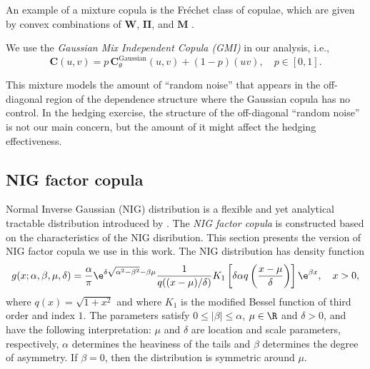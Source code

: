 
An example of a mixture copula is the Fr\'echet class of copulae, which
are given by convex combinations of $\bm{W}$, $\bm{\Pi}$, and $\bm{M}$
\citep{Nelsen1999}.  

We use the {\em Gaussian Mix Independent Copula (GMI)} in our analysis,
i.e., 
\begin{equation*}
  \bm{C}(u,v) = p\, \bm{C}^\text{Gaussian}_\theta (u,v) + (1-p)(uv),\quad p\in [0,1].
\end{equation*}

This mixture models the amount of ``random noise'' that appears in the
off-diagonal region of the dependence structure where the Gaussian copula has no control.
In the hedging exercise, the structure of the off-diagonal ``random noise'' is not our main concern, 
but the amount of it might affect the hedging effectiveness.

\subsection{NIG factor copula}

Normal Inverse Gaussian (NIG) distribution is a flexible and yet analytical tractable distribution introduced by
\citep{BarndorffNielsen1997}.
The {\em NIG factor copula} is constructed based on the characteristics of the NIG disribution. 
This section presents the version of NIG factor copula we use in this work.
The NIG distribution has density function
\begin{equation*}
  g(x; \alpha,\beta, \mu, \delta) = \frac{\alpha}{\pi} \e^{\delta
    \sqrt{\alpha^2-\beta^2} -\beta\mu} \frac{1}{q((x-\mu)/\delta)}
  K_1\left[\delta \alpha q\left(\frac{x-\mu}{\delta}\right) \right]
  \e^{\beta x},\quad x>0,
\end{equation*}
where $q(x) = \sqrt{1+x^2}$ and where $K_1$ is the modified Bessel
function of third order and index $1$. The parameters satisfy $0\leq
|\beta|\leq \alpha$, $\mu\in \R$ and $\delta>0$, and have
the following interpretation: $\mu$ and $\delta$ are location and
scale parameters, respectively, $\alpha$ determines the heaviness of
the tails and $\beta$ determines the degree of asymmetry. If
$\beta=0$, then the distribution is symmetric around $\mu$.

